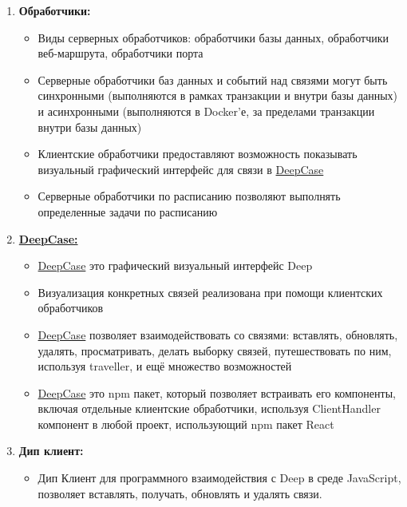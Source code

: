 \documentclass{article}
\begin{document}
\begin{enumerate}
  \item \textbf{Обработчики:}
        \begin{itemize}
          \item Виды серверных обработчиков: обработчики базы данных,
                обработчики веб-маршрута, обработчики порта
          \item Серверные обработчики баз данных и событий над связями могут
                быть синхронными (выполняются в рамках транзакции и внутри базы
                данных) и
                асинхронными (выполняются в Docker'е, за пределами транзакции
                внутри базы
                данных)
          \item Клиентские обработчики предоставляют возможность показывать
                визуальный графический интерфейс для связи в
                \hyperlink{DeepCase.Description}{DeepCase}
          \item Серверные обработчики по расписанию позволяют выполнять
                определенные задачи по расписанию
        \end{itemize}

  \item \textbf{\hyperlink{DeepCase.Description}{DeepCase:}}
        \begin{itemize}
          \item \hyperlink{DeepCase.Description}{DeepCase} это графический визуальный
                интерфейс Deep
          \item Визуализация конкретных связей реализована при помощи
                клиентских обработчиков
          \item \hyperlink{DeepCase.Description}{DeepCase} позволяет взаимодействовать
                со связями: вставлять,
                обновлять, удалять, просматривать, делать выборку связей,
                путешествовать по ним, используя traveller, и ещё множество
                возможностей
          \item \hyperlink{DeepCase.Description}{DeepCase} это npm пакет, который
                позволяет встраивать его
                компоненты, включая отдельные клиентские обработчики, используя
                ClientHandler
                компонент в любой проект, использующий npm пакет React
        \end{itemize}

  \item \textbf{Дип клиент:}
        \begin{itemize}
          \item Дип Клиент для программного взаимодействия с Deep в среде
                JavaScript, позволяет вставлять, получать, обновлять и удалять
                связи.
        \end{itemize}


\end{enumerate}
\end{document}
